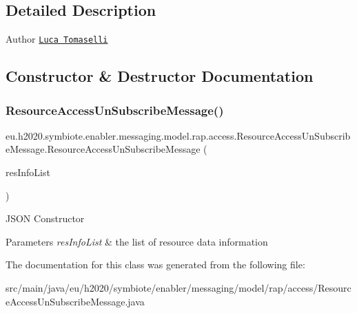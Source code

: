 \subsection{Detailed Description}
\begin{DoxyAuthor}{Author}
\href{mailto:l.tomaselli@nextworks.it}{\tt Luca Tomaselli} 
\end{DoxyAuthor}


\subsection{Constructor \& Destructor Documentation}
\mbox{\label{classeu_1_1h2020_1_1symbiote_1_1enabler_1_1messaging_1_1model_1_1rap_1_1access_1_1ResourceAccessUnSubscribeMessage_ade3281f6257947452ff83e796e66b8fa}} 
\subsubsection{\texorpdfstring{Resource\+Access\+Un\+Subscribe\+Message()}{ResourceAccessUnSubscribeMessage()}}
{\footnotesize\ttfamily eu.\+h2020.\+symbiote.\+enabler.\+messaging.\+model.\+rap.\+access.\+Resource\+Access\+Un\+Subscribe\+Message.\+Resource\+Access\+Un\+Subscribe\+Message (\begin{DoxyParamCaption}\item[{@Json\+Property(\char`\"{}resource\+Info\char`\"{}) List$<$ \hyperlink{classeu_1_1h2020_1_1symbiote_1_1enabler_1_1messaging_1_1model_1_1rap_1_1db_1_1ResourceInfo}{Resource\+Info} $>$}]{res\+Info\+List }\end{DoxyParamCaption})}

J\+S\+ON Constructor 
\begin{DoxyParams}{Parameters}
{\em res\+Info\+List} & the list of resource data information \\
\hline
\end{DoxyParams}


The documentation for this class was generated from the following file\+:\begin{DoxyCompactItemize}
\item 
src/main/java/eu/h2020/symbiote/enabler/messaging/model/rap/access/Resource\+Access\+Un\+Subscribe\+Message.\+java\end{DoxyCompactItemize}
